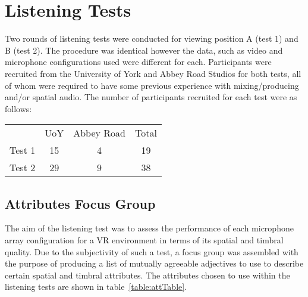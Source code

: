 
















\section{Listening Tests}

	Two rounds of listening tests were conducted for viewing position A (test 1) and B (test 2). The procedure was identical however the data, such as video and microphone configurations used were different for each. Participants were recruited from the University of York and Abbey Road Studios for both tests, all of whom were required to have some previous experience with mixing/producing and/or spatial audio. The number of participants recruited for each test were as follows:

	\begin{center}	
	\vspace{5pt}
	\begin{tabular}{l c c c}
		& UoY & Abbey Road & Total\\ 
		Test 1 & 15 & 4 & 19\\ 
		Test 2 & 29 & 9 & 38\\ 
	\end{tabular}
	\end{center}

	\subsection{Attributes Focus Group}
		The aim of the listening test was to assess the performance of each microphone array configuration for a VR environment in terms of its spatial and timbral quality. Due to the subjectivity of such a test, a focus group was assembled with the purpose of producing a list of mutually agreeable adjectives to use to describe certain spatial and timbral attributes. The attributes chosen to use within the listening tests are shown in table~\ref{table:attTable}. \\

